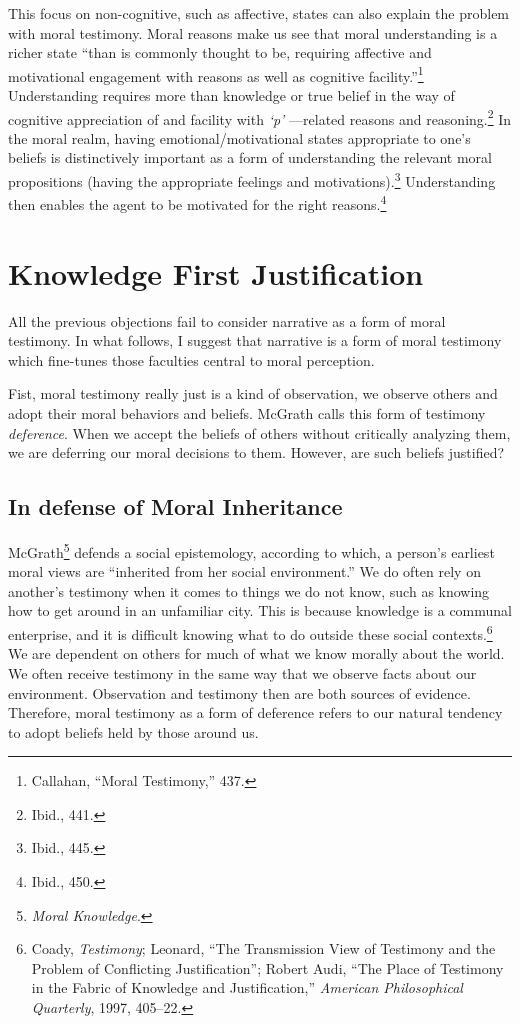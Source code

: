 \documentclass[phdthesis,12pt,final]{wuthesis}
\theoremstyle{definition}
\theoremstyle{definition}
\theoremstyle{definition}
\theoremstyle{definition}
\theoremstyle{remark}
\begin{document}
This focus on non-cognitive, such as affective, states can also explain the problem with moral testimony. Moral reasons make us see that moral understanding is a richer state ``than is commonly thought to be, requiring affective and motivational engagement with reasons as well as cognitive facility.''\footnote{Callahan, {``Moral {Testimony},''} 437.} Understanding requires more than knowledge or true belief in the way of cognitive appreciation of and facility with \emph{`p'} ---related reasons and reasoning.\footnote{Ibid., 441.} In the moral realm, having emotional/motivational states appropriate to one's beliefs is distinctively important as a form of understanding the relevant moral propositions (having the appropriate feelings and motivations).\footnote{Ibid., 445.} Understanding then enables the agent to be motivated for the right reasons.\footnote{Ibid., 450.}

\section{Knowledge First Justification}\label{knowledge-first-justification-1}

All the previous objections fail to consider narrative as a form of moral testimony. In what follows, I suggest that narrative is a form of moral testimony which fine-tunes those faculties central to moral perception.

Fist, moral testimony really just is a kind of observation, we observe others and adopt their moral behaviors and beliefs. McGrath calls this form of testimony \emph{deference}. When we accept the beliefs of others without critically analyzing them, we are deferring our moral decisions to them. However, are such beliefs justified?

\subsection*{In defense of Moral Inheritance}\label{in-defense-of-moral-inheritance-1}

McGrath\footnote{\emph{Moral {Knowledge}}.} defends a social epistemology, according to which, a person's earliest moral views are ``inherited from her social environment.'' We do often rely on another's testimony when it comes to things we do not know, such as knowing how to get around in an unfamiliar city. This is because knowledge is a communal enterprise, and it is difficult knowing what to do outside these social contexts.\footnote{Coady, \emph{Testimony}; Leonard, {``The {Transmission View} of {Testimony} and the {Problem} of {Conflicting Justification}''}; Robert Audi, {``The {Place} of {Testimony} in the {Fabric} of {Knowledge} and {Justification},''} \emph{American Philosophical Quarterly}, 1997, 405--22.} We are dependent on others for much of what we know morally about the world. We often receive testimony in the same way that we observe facts about our environment. Observation and testimony then are both sources of evidence. Therefore, moral testimony as a form of deference refers to our natural tendency to adopt beliefs held by those around us.
\end{document}
